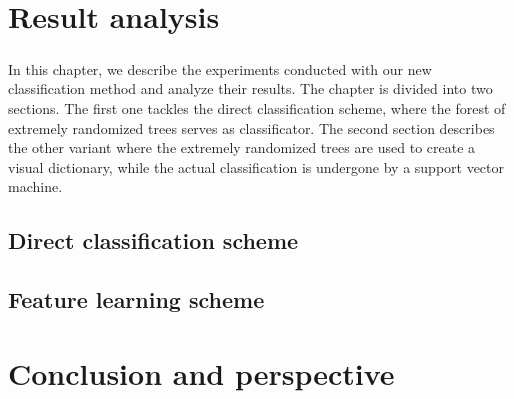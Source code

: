 \documentclass[a4paper]{report}
\begin{document}

		
\chapter{Result analysis}
\paragraph{}
In this chapter, we describe the experiments conducted with our new classification method and analyze their results. The chapter is divided into two sections. The first one tackles the direct classification scheme, where the forest of extremely randomized trees serves as classificator. The second section describes the other variant where the extremely randomized trees are used to create a visual dictionary, while the actual classification is undergone by a support vector machine.
	\section{Direct classification scheme}
	\section{Feature learning scheme}
\chapter{Conclusion and perspective}
 


  
\end{document}
